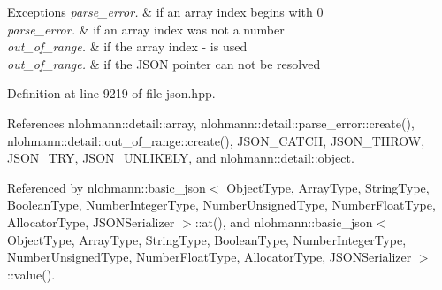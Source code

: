 \begin{DoxyExceptions}{Exceptions}
{\em parse\+\_\+error.} & if an array index begins with \textquotesingle{}0\textquotesingle{} \\
\hline
{\em parse\+\_\+error.} & if an array index was not a number \\
\hline
{\em out\+\_\+of\+\_\+range.} & if the array index \textquotesingle{}-\/\textquotesingle{} is used \\
\hline
{\em out\+\_\+of\+\_\+range.} & if the J\+S\+ON pointer can not be resolved \\
\hline
\end{DoxyExceptions}


Definition at line 9219 of file json.\+hpp.



References nlohmann\+::detail\+::array, nlohmann\+::detail\+::parse\+\_\+error\+::create(), nlohmann\+::detail\+::out\+\_\+of\+\_\+range\+::create(), J\+S\+O\+N\+\_\+\+C\+A\+T\+CH, J\+S\+O\+N\+\_\+\+T\+H\+R\+OW, J\+S\+O\+N\+\_\+\+T\+RY, J\+S\+O\+N\+\_\+\+U\+N\+L\+I\+K\+E\+LY, and nlohmann\+::detail\+::object.



Referenced by nlohmann\+::basic\+\_\+json$<$ Object\+Type, Array\+Type, String\+Type, Boolean\+Type, Number\+Integer\+Type, Number\+Unsigned\+Type, Number\+Float\+Type, Allocator\+Type, J\+S\+O\+N\+Serializer $>$\+::at(), and nlohmann\+::basic\+\_\+json$<$ Object\+Type, Array\+Type, String\+Type, Boolean\+Type, Number\+Integer\+Type, Number\+Unsigned\+Type, Number\+Float\+Type, Allocator\+Type, J\+S\+O\+N\+Serializer $>$\+::value().


